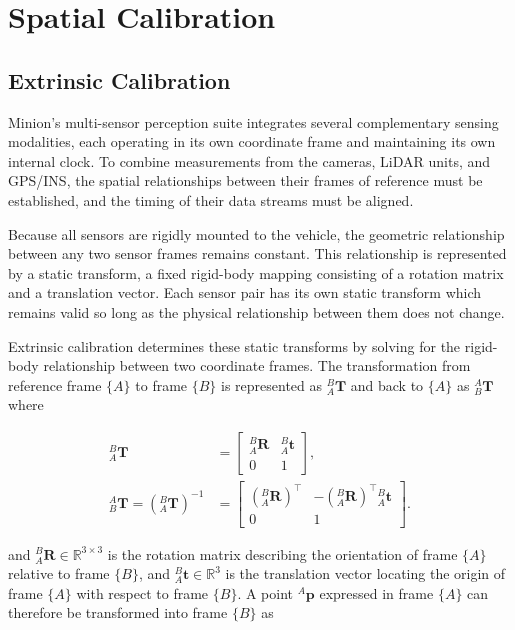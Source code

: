 \documentclass{erauthesis}
\begin{document}
\section{Spatial Calibration} \label{sec:calibration_spatial}

\subsection{Extrinsic Calibration}

Minion’s multi-sensor perception suite integrates several complementary sensing modalities, each operating in its own coordinate frame and maintaining its own internal clock. To combine measurements from the cameras, LiDAR units, and GPS/INS, the spatial relationships between their frames of reference must be established, and the timing of their data streams must be aligned.

Because all sensors are rigidly mounted to the vehicle, the geometric relationship between any two sensor frames remains constant. 
This relationship is represented by a static transform, a fixed rigid-body mapping consisting of a rotation matrix and a translation vector.
Each sensor pair has its own static transform which remains valid so long as the physical relationship between them does not change. 

Extrinsic calibration determines these static transforms by solving for the rigid-body relationship between two coordinate frames. The transformation from reference frame $\{A\}$ to frame $\{B\}$ is represented as ${}_{A}^{B}\mathbf{T}$ and back to $\{A\}$ as ${}_{B}^{A}\mathbf{T}$ where

\begin{align}
{}_{A}^{B}\mathbf{T} &=
\begin{bmatrix}
{}_{A}^{B}\mathbf{R} & {}_{A}^{B}\mathbf{t} \\
0 & 1
\end{bmatrix}, \\[1ex]
{}_{B}^{A}\mathbf{T} =
\left({}_{A}^{B}\mathbf{T}\right)^{-1}
&=
\begin{bmatrix}
\left({}_{A}^{B}\mathbf{R}\right)^{\top} &
-\left({}_{A}^{B}\mathbf{R}\right)^{\top} {}_A^{B}\mathbf{t} \\
0 & 1
\end{bmatrix}.
\end{align}

and $_{A}^{B}\mathbf{R} \in \mathbb{R}^{3\times3}$ is the rotation matrix describing the orientation of frame $\{A\}$ relative to frame $\{B\}$, and $_{A}^{B}\mathbf{t} \in \mathbb{R}^{3}$ is the translation vector locating the origin of frame $\{A\}$ with respect to frame $\{B\}$.  
A point $^{A}\mathbf{p}$ expressed in frame $\{A\}$ can therefore be transformed into frame $\{B\}$ as
\end{document}
